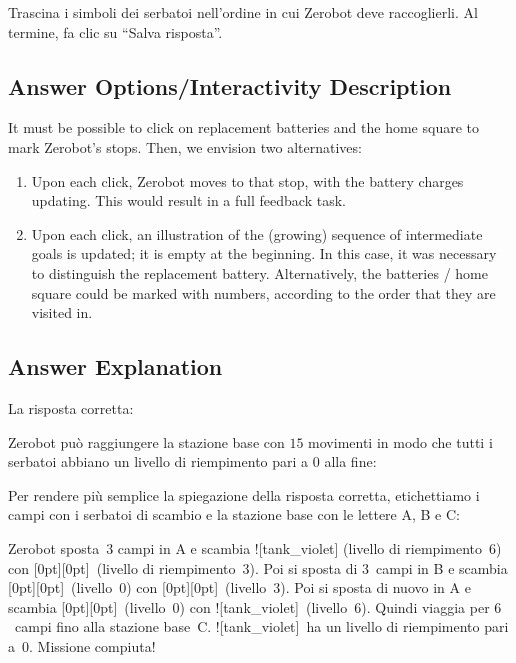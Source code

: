 \documentclass[a4paper,11pt]{report}
\newcommand{\taskGraphicsFolder}{..}
\begin{document}
Trascina i simboli dei serbatoi nell’ordine in cui Zerobot deve raccoglierli. Al termine, fa clic su \enquote{Salva risposta}.

\begingroup
\renewcommand{\arraystretch}{1.5}
\subsection*{Answer Options/Interactivity Description}

It must be possible to click on replacement batteries and the home square to mark Zerobot’s stops. Then, we envision two alternatives:

\begin{enumerate}
  \item Upon each click, Zerobot moves to that stop, with the battery charges updating. This would result in a full feedback task.
  \item Upon each click, an illustration of the (growing) sequence of intermediate goals is updated; it is empty at the beginning. In this case, it was necessary to distinguish the replacement battery. Alternatively, the batteries / home square could be marked with numbers, according to the order that they are visited in.
\end{enumerate}

\endgroup

\subsection*{Answer Explanation}

La risposta corretta:

{\centering%
\par}

Zerobot può raggiungere la stazione base con $15$ movimenti in modo che tutti i serbatoi abbiano un livello di riempimento pari a $0$ alla fine:

{\centering%
\par}

Per rendere più semplice la spiegazione della risposta corretta, etichettiamo i campi con i serbatoi di scambio e la stazione base con le lettere A, B e C:

Zerobot sposta~$3$ campi in A e scambia ![tank\_violet] (livello di riempimento~$6$) con \raisebox{-0.5ex}[0pt][0pt]{}~(livello di riempimento~$3$). Poi si sposta di $3$~campi in B e scambia \raisebox{-0.5ex}[0pt][0pt]{}~(livello~$0$) con \raisebox{-0.5ex}[0pt][0pt]{}~(livello~$3$). Poi si sposta di nuovo in A e scambia \raisebox{-0.5ex}[0pt][0pt]{}~(livello~$0$) con ![tank\_violet]~(livello~$6$). Quindi viaggia per $6$~campi fino alla stazione base~C. ![tank\_violet]~ha un livello di riempimento pari a~$0$. Missione compiuta!
\end{document}
